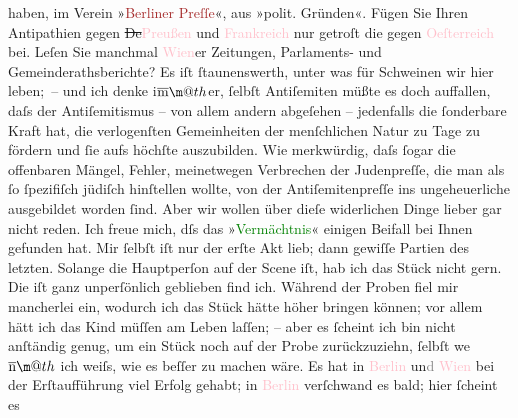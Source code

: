 \documentclass[twoside=false,titlepage=false,open=any, parskip=never, fontsize=12pt, headings=small, chapterprefix=false, appendixprefix=false]{scrbook}
\makeatletter
\newcommand{\strikeout}[1]{\sout{#1}}
\newcommand{\Theight}{\dimexpr\fontcharht\font`W}
\newcommand{\pbposition}{\depth}
\newcommand{\pb}{\nobreak\hspace{0pt}\raisebox{-0.1em}{\raisebox{\pbposition}{\textnormal{|}}}\nobreak\hspace{0pt}}
\newcommand{\introOben}{\textnormal{\raisebox{\Theight}{\raisebox{-\height}{\small{v}\normalsize}}}}
\newcommand*{\geminationm}{$\overline{\hbox{m}}\m@th$}
\newcommand*{\geminationn}{$\overline{\hbox{n}}\m@th$}
\makeatother
\begin{document}
                    haben, im Verein »\textcolor{brown}{Berliner Preſſe}{}\ledrightnote{\textcolor{brown}{Verein Berliner Presse}}«, aus »polit.
                    Gründen«. Fügen Sie Ihren Antipathien gegen \strikeout{De}\textcolor{pink}{Preußen}{}\ledrightnote{\textcolor{pink}{Preußen}} und \textcolor{pink}{Frankreich}{}\ledrightnote{\textcolor{pink}{Frankreich}} nur getroſt \introOben{}die\introOben{} gegen \textcolor{pink}{Oeſterreich}{}\ledrightnote{\textcolor{pink}{Österreich}} bei. Leſen Sie manchmal \textcolor{pink}{Wien}{}\ledrightnote{\textcolor{pink}{Wien}}er Zeitungen, Parlaments- und
                    Gemeinderathsberichte? Es iſt ſtaunenswerth, unter was für Schweinen wir hier
                    leben; – und {\pb}ich denke i{\geminationm}er, ſelbſt Antiſemiten müßte es doch auffallen,
                    daſs der Antiſemitismus – von allem andern abgeſehen – jedenfalls die ſonderbare
                    Kraft hat, die verlogenſten Gemeinheiten der menſchlichen Natur zu Tage zu
                    fördern und ſie aufs höchſte auszubilden. Wie merkwürdig, daſs ſogar die
                    offenbaren Mängel, Fehler, meinetwegen Verbrechen der Judenpreſſe, die man als
                    ſo ſpezifiſch jüdiſch hinſtellen wollte, von der Antiſemiten{\pb}preſſe ins ungeheuerliche ausgebildet worden
                    ſind. Aber wir wollen über dieſe widerlichen Dinge lieber gar nicht reden.\pend
           \pstart
           Ich freue mich, dſs das »\textcolor{green}{Vermächtnis}{}\ledrightnote{\textcolor{green}{Das Vermächtnis. Schauspiel in drei Akten}}« einigen
                    Beifall bei Ihnen gefunden hat. Mir ſelbſt iſt nur der erſte Akt lieb; dann
                    gewiſſe Partien des letzten. Solange die Hauptperſon auf der Scene iſt, hab ich
                    das Stück nicht gern. Die iſt ganz unperſönlich geblieben find ich. Während der
                    Proben fiel mir mancherlei ein, wodurch ich das Stück hätte höher bringen
                    können; vor allem hätt ich das Kind {\pb}müſſen
                    am Leben laſſen; – aber es ſcheint ich bin nicht anſtändig genug, um ein Stück
                    noch auf der Probe zurückzuziehn, ſelbſt we{\geminationn} ich
                    weiſs, wie es beſſer zu machen wäre. Es hat in \textcolor{pink}{Berlin}{}\ledrightnote{\textcolor{pink}{Berlin}} un\textcolor{gray}{d}{ }\textcolor{pink}{Wien}{}\ledrightnote{\textcolor{pink}{Wien}} bei der Erſtaufführung viel Erfolg gehabt;
                    in \textcolor{pink}{Berlin}{}\ledrightnote{\textcolor{pink}{Berlin}} verſchwand es bald; hier ſcheint es
\end{document}
